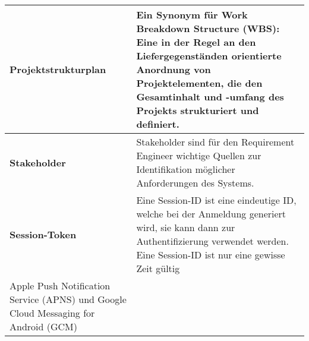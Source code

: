 \begin{longtable}{|m{3cm}|m{11cm}|}
	\textbf{Projektstrukturplan}&
	Ein Synonym für Work Breakdown Structure (WBS): Eine in der Regel an den Liefergegenständen orientierte Anordnung von Projektelementen, die den Gesamtinhalt und -umfang des Projekts strukturiert und definiert.\cite{proj_mgmt_book}\\ \hline	

	\textbf{Stakeholder}&
	Stakeholder sind für den Requirement Engineer wichtige Quellen zur Identifikation möglicher Anforderungen des Systems.\cite{req_eng_book}\\ \hline		

	\textbf{Session-Token}&
	Eine Session-ID ist eine eindeutige ID, welche bei der Anmeldung generiert wird, sie kann dann zur Authentifizierung verwendet werden. Eine Session-ID ist nur eine gewisse Zeit gültig \\ \hline		

Apple Push Notification Service (APNS) und Google Cloud Messaging for Android (GCM)	


\end{longtable}
